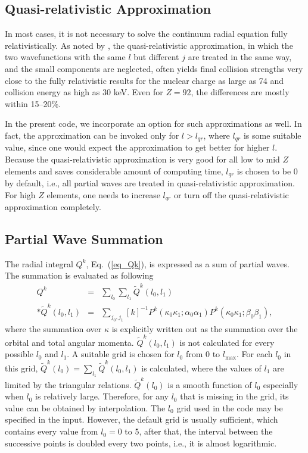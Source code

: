 \subsection{Quasi-relativistic Approximation}
In most cases, it is not necessary to solve the continuum radial equation fully
relativistically. As noted by \citet{zhang:1989a}, the quasi-relativistic
approximation, in which the two wavefunctions with the same $l$ but different
$j$ are treated in the same way, and the small components are neglected, often
yields final collision strengths very close to the fully relativistic results
for the nuclear charge as large as 74 and collision energy as high as 30 keV.
Even for $Z = 92$, the differences are mostly within 15--20\%. 

In the present code, we incorporate an option for such approximations as
well. In fact, the 
approximation can be invoked only for $l > l_{qr}$, where $l_{qr}$ is some
suitable value, since one would expect the approximation to get better for
higher $l$. Because
the quasi-relativistic approximation is very good for all low to mid $Z$
elements and saves 
considerable amount of computing time, $l_{qr}$ is chosen to be 0 by default,
i.e., all 
partial waves are treated in quasi-relativistic approximation. For high $Z$
elements, one needs to increase $l_{qr}$ or turn off the quasi-relativistic
approximation completely.

\subsection{Partial Wave Summation}
The radial integral $Q^k$, Eq.~(\ref{eq_Qk}), is expressed as a sum of
partial waves. The summation is evaluated as following
\begin{eqnarray}
Q^k &=& \sum_{l_0}\sum_{l_1} \tilde{Q}^k(l_0,l_1) \nonumber\\*
\tilde{Q}^k(l_0,l_1) &=& \sum_{j_0,j_1}
[k]^{-1}P^k(\kappa_0\kappa_1;\alpha_0\alpha_1)
P^k(\kappa_0\kappa_1;\beta_0\beta_1),
\end{eqnarray}
where the summation over $\kappa$ is explicitly written out as the summation
over the orbital and total angular momenta. $\tilde{Q}^k(l_0,l_1)$ is not
calculated for every possible $l_0$ and $l_1$. A suitable grid is chosen for
$l_0$ from 0 to $l_\mathrm{max}$. For each  $l_0$ in this grid,
$\tilde{Q}^k(l_0) = \sum_{l_1}\tilde{Q}^k(l_0,l_1)$ is calculated, where the
values of $l_1$ are limited by the triangular relations. $\tilde{Q}^k(l_0)$ is a
smooth function of $l_0$ especially when  $l_0$ is relatively large. Therefore,
for any $l_0$ that is missing in the grid, its value can be obtained by
interpolation. The $l_0$ grid used in the code may be specified in the input.
However, the default grid is usually sufficient, which contains every value from
$l_0 = 0$ to 5, after that, the interval between the successive points is
doubled every two points, i.e., it is almost logarithmic. 

